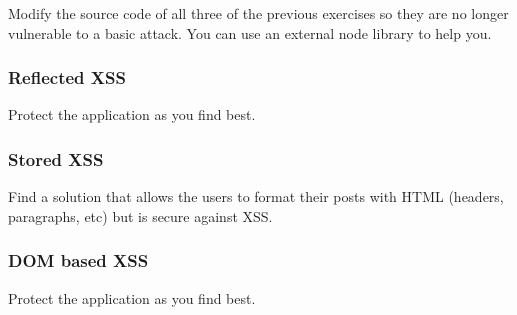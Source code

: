 \begin{Exercise}[label={websec-xss-prevention}]
	Modify the source code of all three of the previous exercises so they are no longer vulnerable to a basic attack. You can use an external node library to help you.
	\subsubsection{Reflected XSS}
	Protect the application as you find best.
	\subsubsection{Stored XSS}
	Find a solution that allows the users to format their posts with HTML (headers, paragraphs, etc) but is secure against XSS.
	\subsubsection{DOM based XSS}
	Protect the application as you find best.
\end{Exercise}

